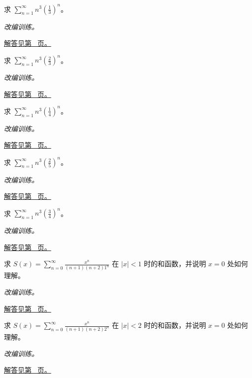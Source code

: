 \documentclass[12pt,fontset=fandol]{ctexart}
\begin{document}
\begin{example}[立方系数的几何和]\label{ex:c27q8}
求 $\displaystyle\sum_{n=1}^\infty n^3(\frac{1}{3})^n$。
\par\textit{改编训练。}\par\hyperref[ans:c27q8]{解答见第~\pageref{ans:c27q8} 页。}
\end{example}
\begin{example}[立方系数的几何和]\label{ex:c27q9}
求 $\displaystyle\sum_{n=1}^\infty n^3(\frac{2}{3})^n$。
\par\textit{改编训练。}\par\hyperref[ans:c27q9]{解答见第~\pageref{ans:c27q9} 页。}
\end{example}
\begin{example}[立方系数的几何和]\label{ex:c27q10}
求 $\displaystyle\sum_{n=1}^\infty n^3(\frac{1}{4})^n$。
\par\textit{改编训练。}\par\hyperref[ans:c27q10]{解答见第~\pageref{ans:c27q10} 页。}
\end{example}
\begin{example}[立方系数的几何和]\label{ex:c27q11}
求 $\displaystyle\sum_{n=1}^\infty n^3(\frac{2}{5})^n$。
\par\textit{改编训练。}\par\hyperref[ans:c27q11]{解答见第~\pageref{ans:c27q11} 页。}
\end{example}
\begin{example}[立方系数的几何和]\label{ex:c27q12}
求 $\displaystyle\sum_{n=1}^\infty n^3(\frac{3}{4})^n$。
\par\textit{改编训练。}\par\hyperref[ans:c27q12]{解答见第~\pageref{ans:c27q12} 页。}
\end{example}
\begin{example}[两次积分产生的系数]\label{ex:c27q13}
求 $S(x)=\displaystyle\sum_{n=0}^\infty\frac{x^n}{(n+1)(n+2)1^n}$ 在 $|x|<1$ 时的和函数，并说明 $x=0$ 处如何理解。
\par\textit{改编训练。}\par\hyperref[ans:c27q13]{解答见第~\pageref{ans:c27q13} 页。}
\end{example}
\begin{example}[两次积分产生的系数]\label{ex:c27q14}
求 $S(x)=\displaystyle\sum_{n=0}^\infty\frac{x^n}{(n+1)(n+2)2^n}$ 在 $|x|<2$ 时的和函数，并说明 $x=0$ 处如何理解。
\par\textit{改编训练。}\par\hyperref[ans:c27q14]{解答见第~\pageref{ans:c27q14} 页。}
\end{example}
\end{document}
